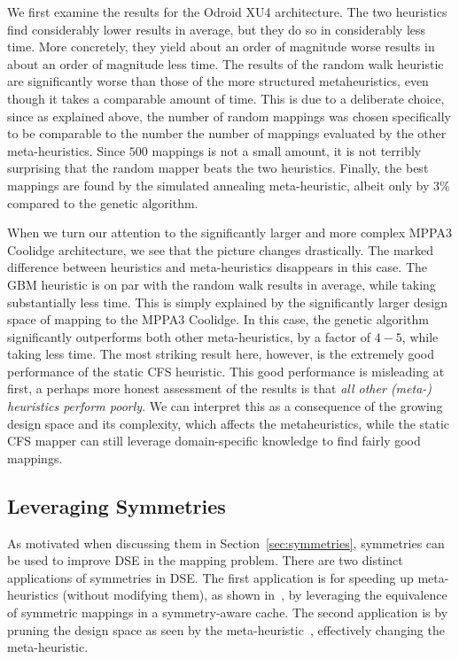 We first examine the results for the Odroid XU4 architecture.
The two heuristics find considerably lower results in average, but they do so in considerably less time.
More concretely, they yield about an order of magnitude worse results in about an order of magnitude less time.
The results of the random walk heuristic are significantly worse than those of the more structured metaheuristics, even though it takes a comparable amount of time.
This is due to a deliberate choice, since as explained above, the number of random mappings was chosen specifically to be comparable to the number the number of mappings evaluated by the other meta-heuristics.
Since $500$ mappings is not a small amount, it is not terribly surprising that the random mapper beats the two heuristics.
Finally, the best mappings are found by the simulated annealing meta-heuristic, albeit only by $3\%$ compared to the genetic algorithm.

When we turn our attention to the significantly larger and more complex MPPA3 Coolidge architecture, we see that the picture changes drastically.
The marked difference between heuristics and meta-heuristics disappears in this case.
The \ac{GBM} heuristic is on par with the random walk results in average, while taking substantially less time.
This is simply explained by the significantly larger design space of mapping to the MPPA3 Coolidge.
In this case, the genetic algorithm significantly outperforms both other meta-heuristics, by a factor of $4-5$, while taking less time.
The most striking result here, however, is the extremely good performance of the static CFS heuristic.
This good performance is misleading at first, a perhaps more honest assessment of the results is that \emph{all other (meta-) heuristics perform poorly}.
We can interpret this as a consequence of the growing design space and its complexity, which affects the metaheuristics, while the static CFS mapper can still leverage domain-specific knowledge to find fairly good mappings.


\subsection{Leveraging Symmetries}

As motivated when discussing them in Section~\ref{sec:symmetries}, symmetries can be used to improve \ac{DSE} in the mapping problem.
There are two distinct applications of symmetries in \ac{DSE}.
The first application is for speeding up meta-heuristics (without modifying them), as shown in~\cite{goens_taco17}, by leveraging the equivalence of symmetric mappings in a symmetry-aware cache.
The second application is by pruning the design space as seen by the meta-heuristic~\cite{goens_mcsoc18,goens_tcad21}, effectively changing the meta-heuristic.

